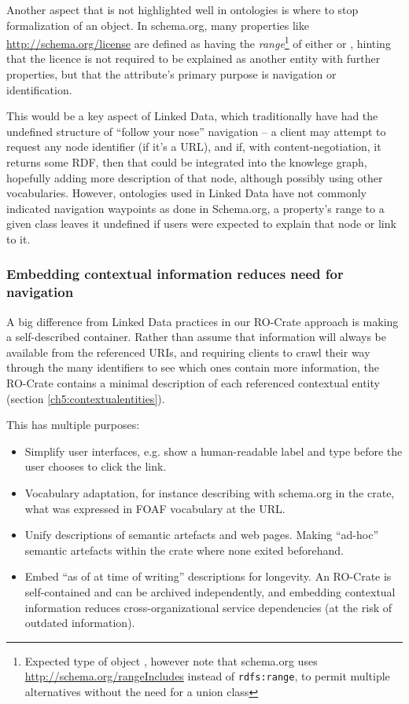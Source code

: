 Another aspect that is not highlighted well in ontologies is where to stop formalization of an object. In schema.org, many properties like \url{http://schema.org/license} are defined as having the \emph{range}\footnote{Expected type of object \cite{w3-rdf-schema}, however note that schema.org uses \url{http://schema.org/rangeIncludes} instead of \texttt{rdfs:range}, to permit multiple alternatives without the need for a union class} of either  or , hinting that the licence is not required to be explained as another entity with further properties, but that the attribute's primary purpose is navigation or identification. 

This would be a key aspect of Linked Data, which traditionally have had the undefined structure of ``follow your nose'' navigation -- a client may attempt to request any node identifier (if it's a URL), and if, with content-negotiation, it returns some RDF, then that could be integrated into the knowlege graph, hopefully adding more description of that node, although possibly using other vocabularies. However, ontologies used in Linked Data have not commonly indicated navigation waypoints as done in Schema.org, a property's range to a given class leaves it undefined if users were expected to explain that node or link to it.


\subsubsection{Embedding contextual information reduces need for navigation}

A big difference from Linked Data practices in our RO-Crate approach is making a self-described container. Rather than assume that information will always be available from the referenced URIs, and requiring clients to crawl their way through the many identifiers to see which ones contain more information, the RO-Crate contains a minimal description of each referenced contextual entity (section \vref{ch5:contextualentities}). 

This has multiple purposes:

\begin{itemize}
    \item Simplify user interfaces, e.g. show a human-readable label and type before the user chooses to click the link.
    \item Vocabulary adaptation, for instance describing with schema.org in the crate, what was expressed in FOAF vocabulary at the URL.
    \item Unify descriptions of semantic artefacts and web pages. Making ``ad-hoc'' semantic artefacts within the crate where none exited beforehand.
    \item Embed ``as of at time of writing'' descriptions for longevity. An RO-Crate is self-contained and can be archived independently, and embedding contextual information reduces cross-organizational service dependencies (at the risk of outdated information).
\end{itemize}

